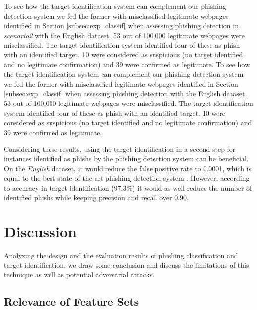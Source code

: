 \documentclass[10pt,conference,compsocconf,letterpaper]{IEEEtran}
\begin{document}
\iffeateval
To see how the target identification system can complement our phishing detection system we fed the former with misclassified legitimate webpages identified in Section \ref{subsec:exp_classif} when assessing phishing detection in \textit{scenario2} with the English dataset. 53 out of 100,000 legitimate webpages were misclassified. The target identification system identified four of these as phish with an identified target. 10 were considered as suspicious (no target identified and no legitimate confirmation) and 39 were confirmed as legitimate.
\else
To see how the target identification system can complement our phishing detection system we fed the former with misclassified legitimate webpages identified in Section \ref{subsec:exp_classif} when assessing phishing detection with the English dataset. 53 out of 100,000 legitimate webpages were misclassified. The target identification system identified four of these as phish with an identified target. 10 were considered as suspicious (no target identified and no legitimate confirmation) and 39 were confirmed as legitimate.
\fi

Considering these results, using the target identification in a second step for instances identified as phishs by the phishing detection system can be beneficial. On the \textit{English} dataset, it would reduce the false positive rate to 0.0001, which is equal to the best state-of-the-art phishing detection system \cite{whittaker:2010:large}. However, according to accuracy in target identification (97.3\%) it would as well reduce the number of identified phishs while keeping precision and recall over 0.90.
\section{Discussion}

\iffullversion
Analyzing the design and the evaluation results of phishing classification and target identification, we draw some conclusion and discuss the limitations of this technique as well as potential adversarial attacks.
\fi

\subsection{Relevance of Feature Sets}
\end{document}
